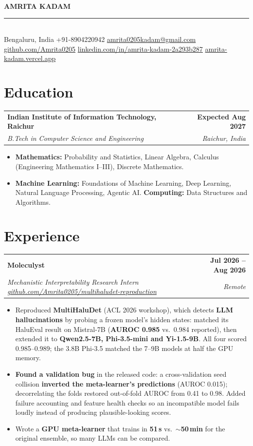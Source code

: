 \documentclass[letterpaper,10pt]{article}
\makeatletter
\newif\ifxchar
\newcommand{\sep}{\hspace{5pt}{\color{accent}|}\hspace{5pt}}
\newcommand{\lnk}[2]{\href{#1}{\color{linkgray}#2}}
\newcommand{\entry}[4]{%
  \begin{tabularx}{\linewidth}{@{}X r@{}}
    \textbf{#1} & \textbf{#2}\\
    \small\textit{#3} & \small\textit{#4}\\
  \end{tabularx}\vspace{-1pt}}
\newenvironment{bullets}{\begin{itemize}\small}{\end{itemize}\vspace{1pt}}
\makeatother
\begin{document}
\begin{center}
  {\LARGE\bfseries\ifxchar\scshape Amrita Kadam\else AMRITA KADAM\fi}\\[2pt]
  \textcolor{accent}{\rule{\linewidth}{0.6pt}}\\[1pt]
  \small Bengaluru, India \sep +91-8904220942 \sep \lnk{mailto:amrita0205kadam@gmail.com}{amrita0205kadam@gmail.com}\\
  \lnk{https://github.com/Amrita0205}{github.com/Amrita0205} \sep
  \lnk{https://www.linkedin.com/in/amrita-kadam-2a293b287}{linkedin.com/in/amrita-kadam-2a293b287} \sep
  \lnk{https://amrita-kadam.vercel.app/}{amrita-kadam.vercel.app}
\end{center}
\vspace{-12pt}

\section{Education}
\entry{Indian Institute of Information Technology, Raichur}{Expected Aug 2027}{B.Tech in Computer Science and Engineering}{Raichur, India}
\begin{bullets}
  \item \textbf{Mathematics:} Probability and Statistics, Linear Algebra, Calculus (Engineering Mathematics I--III), Discrete Mathematics.
  \item \textbf{Machine Learning:} Foundations of Machine Learning, Deep Learning, Natural Language Processing, Agentic AI. \textbf{Computing:} Data Structures and Algorithms.
\end{bullets}

\section{Experience}
\entry{Moleculyst}{Jul 2026 -- Aug 2026}{Mechanistic Interpretability Research Intern \sep \lnk{https://github.com/Amrita0205/multihaludet-reproduction}{github.com/Amrita0205/multihaludet-reproduction}}{Remote}
\begin{bullets}
  \item Reproduced \textbf{MultiHaluDet} (ACL 2026 workshop), which detects \textbf{LLM hallucinations} by probing a frozen model's hidden states: matched its HaluEval result on Mistral-7B (\textbf{AUROC 0.985} vs.\ 0.984 reported), then extended it to \textbf{Qwen2.5-7B, Phi-3.5-mini and Yi-1.5-9B}. All four scored 0.985--0.989; the 3.8B Phi-3.5 matched the 7--9B models at half the GPU memory.
  \item \textbf{Found a validation bug} in the released code: a cross-validation seed collision \textbf{inverted the meta-learner's predictions} (AUROC 0.015); decorrelating the folds restored out-of-fold AUROC from 0.41 to 0.98. Added failure accounting and feature health checks so an incompatible model fails loudly instead of producing plausible-looking scores.
  \item Wrote a \textbf{GPU meta-learner} that trains in \textbf{51\,s} vs.\ $\sim$\textbf{50\,min} for the original ensemble, so many LLMs can be compared.
\end{bullets}
\end{document}
